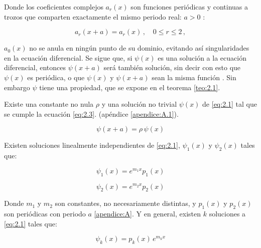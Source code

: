 Donde los coeficientes complejos $a_r(x)$ son funciones periódicas y continuas a trozos que comparten exactamente el mismo periodo real: $a>0$ \cite{floquet}:

\begin{equation}\label{eq:2.2}
    a_r(x+a)=a_r(x)\,,\quad{}0\leq{}r\leq{}2\,,
\end{equation}

$a_0(x)$ no se anula en ningún punto de su dominio, evitando así singularidades en la ecuación diferencial. Se sigue que, si $\psi(x)$ es una solución a la ecuación diferencial, entonces $\psi(x+a)$ será también solución, sin decir con esto que $\psi(x)$ es periódica, o que $\psi(x)$ y $\psi(x+a)$ sean la misma función \cite{floquet}. Sin embargo $\psi$ tiene una propiedad, que se expone en el teorema \ref{teo:2.1}.\\

\begin{teo}\label{teo:2.1}

Existe una constante no nula $\rho$ y una solución no trivial $\psi(x)$ de \ref{eq:2.1} tal que se cumple la ecuación \ref{eq:2.3}. \cite{floquet} (apéndice \ref{apendice:A.1}).

\begin{equation}\label{eq:2.3}
    \psi(x+a)=\rho\, \psi(x)
\end{equation}

\end{teo}

\begin{teo}\label{teo:2.2}
Existen soluciones linealmente independientes de \ref{eq:2.1}, $\psi_1(x)$ y $\psi_2(x)$ tales que:

\begin{equation}\label{eq:2.4}
    \psi_1(x)=e^{m_1x}p_1(x)
\end{equation}

\begin{equation}\label{eq:2.5}
    \psi_2(x)=e^{m_2x}p_2(x)
\end{equation}

Donde $m_1$ y $m_2$ son constantes, no necesariamente distintas, y $p_1(x)$ y $p_2(x)$ son periódicas con periodo $a$ \cite{floquet} \ref{apendice:A}. Y en general, existen $k$ soluciones a \ref{eq:2.1} tales que: 

\begin{equation}\label{eq:2.6}
    \psi_k(x)=p_k(x)\,{}e^{m_kx}
\end{equation}

\end{teo}


